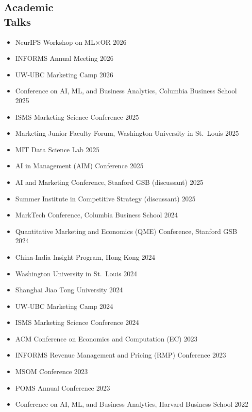 \documentclass[margin,line]{resume}
\begin{document}
\begin{resume}
\section{\mysidestyle Academic\\ Talks}
\begin{itemize}[topsep=-5mm, leftmargin=0mm, itemsep=0pt, parsep=0pt]
    \item [] NeurIPS Workshop on ML$\times$OR \hfill 2026
    \item [] INFORMS Annual Meeting \hfill 2026
    \item [] UW-UBC Marketing Camp \hfill 2026
    \item [] Conference on AI, ML, and Business Analytics, Columbia Business School \hfill 2025
    \item [] ISMS Marketing Science Conference \hfill 2025
    \item [] Marketing Junior Faculty Forum, Washington University in St.\ Louis \hfill 2025
    \item [] MIT Data Science Lab \hfill 2025
    \item [] AI in Management (AIM) Conference \hfill 2025
    \item [] AI and Marketing Conference, Stanford GSB (discussant) \hfill 2025
    \item [] Summer Institute in Competitive Strategy (discussant) \hfill 2025
    \item [] MarkTech Conference, Columbia Business School \hfill 2024
    \item [] Quantitative Marketing and Economics (QME) Conference, Stanford GSB \hfill 2024
    \item [] China-India Insight Program, Hong Kong \hfill 2024
    \item [] Washington University in St.\ Louis \hfill 2024
    \item [] Shanghai Jiao Tong University \hfill 2024
    \item [] UW-UBC Marketing Camp \hfill 2024
    \item [] ISMS Marketing Science Conference \hfill 2024
    \item [] ACM Conference on Economics and Computation (EC) \hfill 2023
    \item [] INFORMS Revenue Management and Pricing (RMP) Conference \hfill 2023
    \item [] MSOM Conference \hfill 2023
    \item [] POMS Annual Conference \hfill 2023
    \item [] Conference on AI, ML, and Business Analytics, Harvard Business School \hfill 2022

\end{itemize}
\end{resume}
\end{document}
